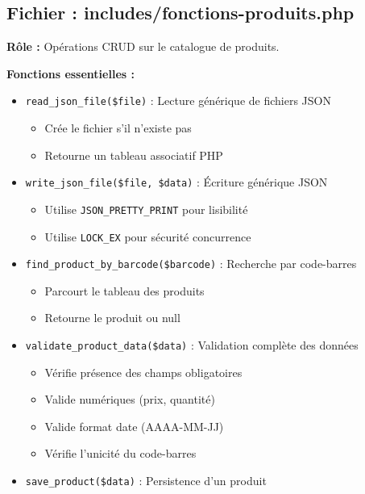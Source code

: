 \documentclass[12pt,a4paper]{report}
\begin{document}
\subsection{Fichier : includes/fonctions-produits.php}

\textbf{Rôle :} Opérations CRUD sur le catalogue de produits.

\textbf{Fonctions essentielles :}

\begin{itemize}
    \item \texttt{read\_json\_file(\$file)} : Lecture générique de fichiers JSON
        \begin{itemize}
            \item Crée le fichier s'il n'existe pas
            \item Retourne un tableau associatif PHP
        \end{itemize}
    
    \item \texttt{write\_json\_file(\$file, \$data)} : Écriture générique JSON
        \begin{itemize}
            \item Utilise \texttt{JSON\_PRETTY\_PRINT} pour lisibilité
            \item Utilise \texttt{LOCK\_EX} pour sécurité concurrence
        \end{itemize}
    
    \item \texttt{find\_product\_by\_barcode(\$barcode)} : Recherche par code-barres
        \begin{itemize}
            \item Parcourt le tableau des produits
            \item Retourne le produit ou null
        \end{itemize}
    
    \item \texttt{validate\_product\_data(\$data)} : Validation complète des données
        \begin{itemize}
            \item Vérifie présence des champs obligatoires
            \item Valide numériques (prix, quantité)
            \item Valide format date (AAAA-MM-JJ)
            \item Vérifie l'unicité du code-barres
        \end{itemize}
    
    \item \texttt{save\_product(\$data)} : Persistence d'un produit
\end{itemize}
\end{document}
